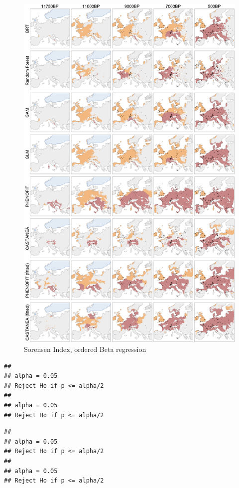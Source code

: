 \documentclass[11pt,]{article}
\begin{document}
\begin{figure}
\centering
\includegraphics{paper_files/figure-latex/figure_2-1.pdf}
\caption{Sorensen Index, ordered Beta regression}
\end{figure}

\begin{verbatim}
## 
## alpha = 0.05
## Reject Ho if p <= alpha/2
## 
## alpha = 0.05
## Reject Ho if p <= alpha/2
\end{verbatim}

\begin{verbatim}
## 
## alpha = 0.05
## Reject Ho if p <= alpha/2
## 
## alpha = 0.05
## Reject Ho if p <= alpha/2
\end{verbatim}
\end{document}
